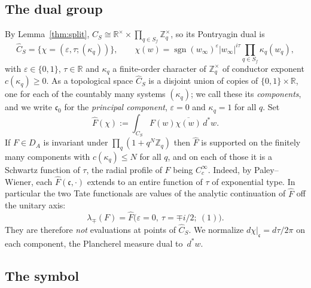 \documentclass[11pt]{amsart}
\theoremstyle{definition}
\theoremstyle{remark}
\newcommand{\R}{\mathbb R}
\newcommand{\Z}{\mathbb Z}
\newcommand{\dstar}{\,d^{*}}
\newcommand{\sgn}{\operatorname{sgn}}
\newcommand{\Ch}{\widehat{C}_S}
\newcommand{\DA}{D_A}
\begin{document}
\subsection{The dual group}

By Lemma~\ref{thm:split}, $C_S\cong\R^{\times}\times\prod_{q\in
S_f}\Z_q^{\times}$, so its Pontryagin dual is
\begin{equation}\label{eq:dual}
\Ch=\bigl\{\chi=(\varepsilon,\tau;(\kappa_q))\bigr\},\qquad
\chi(w)=\sgn(w_{\infty})^{\varepsilon}|w_{\infty}|^{i\tau}
\prod_{q\in S_f}\kappa_q(w_q),
\end{equation}
with $\varepsilon\in\{0,1\}$, $\tau\in\R$ and $\kappa_q$ a finite-order
character of $\Z_q^{\times}$ of conductor exponent $c(\kappa_q)\ge0$.  As a
topological space $\Ch$ is a disjoint union of copies of $\{0,1\}\times\R$,
one for each of the countably many systems $(\kappa_q)$; we call these its
\emph{components}, and we write $\mathfrak c_0$ for the \emph{principal
component}, $\varepsilon=0$ and $\kappa_q=1$ for all $q$.  Set
\begin{equation}\label{eq:FT}
\widehat F(\chi):=\int_{C_S}F(w)\overline{\chi(w)}\dstar w .
\end{equation}
If $F\in\DA$ is invariant under $\prod_q(1+q^{N}\Z_q)$ then $\widehat F$ is
supported on the finitely many components with $c(\kappa_q)\le N$ for all $q$,
and on each of those it is a Schwartz function of $\tau$, the radial profile of
$F$ being $C_c^{\infty}$.  Indeed, by Paley--Wiener, each $\widehat
F(\mathfrak c,\cdot)$ extends to an entire function of $\tau$ of exponential
type.  In particular the two Tate functionals are values of the analytic
continuation of $\widehat F$ off the unitary axis:
\begin{equation}\label{eq:lambdaFT}
\lambda_{\mp}(F)=\widehat F\bigl(\varepsilon=0,\ \tau=\mp i/2;\ (1)\bigr).
\end{equation}
They are therefore \emph{not} evaluations at points of $\Ch$.  We normalize
$d\chi|_{\mathfrak c}=d\tau/2\pi$ on each component, the Plancherel measure
dual to $\dstar w$.

\subsection{The symbol}
\end{document}
